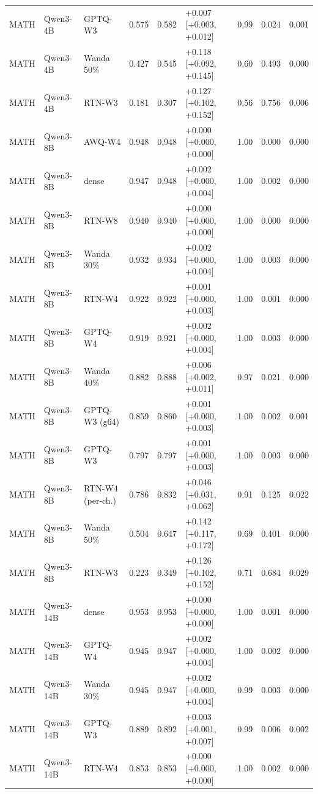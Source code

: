 \begin{tabular}{lllrrlrrr}
MATH & Qwen3-4B & GPTQ-W3 & 0.575 & 0.582 & +0.007 [+0.003, +0.012] & 0.99 & 0.024 & 0.001 \\
MATH & Qwen3-4B & Wanda 50\% & 0.427 & 0.545 & +0.118 [+0.092, +0.145] & 0.60 & 0.493 & 0.000 \\
MATH & Qwen3-4B & RTN-W3 & 0.181 & 0.307 & +0.127 [+0.102, +0.152] & 0.56 & 0.756 & 0.006 \\
MATH & Qwen3-8B & AWQ-W4 & 0.948 & 0.948 & +0.000 [+0.000, +0.000] & 1.00 & 0.000 & 0.000 \\
MATH & Qwen3-8B & dense & 0.947 & 0.948 & +0.002 [+0.000, +0.004] & 1.00 & 0.002 & 0.000 \\
MATH & Qwen3-8B & RTN-W8 & 0.940 & 0.940 & +0.000 [+0.000, +0.000] & 1.00 & 0.000 & 0.000 \\
MATH & Qwen3-8B & Wanda 30\% & 0.932 & 0.934 & +0.002 [+0.000, +0.004] & 1.00 & 0.003 & 0.000 \\
MATH & Qwen3-8B & RTN-W4 & 0.922 & 0.922 & +0.001 [+0.000, +0.003] & 1.00 & 0.001 & 0.000 \\
MATH & Qwen3-8B & GPTQ-W4 & 0.919 & 0.921 & +0.002 [+0.000, +0.004] & 1.00 & 0.003 & 0.000 \\
MATH & Qwen3-8B & Wanda 40\% & 0.882 & 0.888 & +0.006 [+0.002, +0.011] & 0.97 & 0.021 & 0.000 \\
MATH & Qwen3-8B & GPTQ-W3 (g64) & 0.859 & 0.860 & +0.001 [+0.000, +0.003] & 1.00 & 0.002 & 0.001 \\
MATH & Qwen3-8B & GPTQ-W3 & 0.797 & 0.797 & +0.001 [+0.000, +0.003] & 1.00 & 0.003 & 0.000 \\
MATH & Qwen3-8B & RTN-W4 (per-ch.) & 0.786 & 0.832 & +0.046 [+0.031, +0.062] & 0.91 & 0.125 & 0.022 \\
MATH & Qwen3-8B & Wanda 50\% & 0.504 & 0.647 & +0.142 [+0.117, +0.172] & 0.69 & 0.401 & 0.000 \\
MATH & Qwen3-8B & RTN-W3 & 0.223 & 0.349 & +0.126 [+0.102, +0.152] & 0.71 & 0.684 & 0.029 \\
MATH & Qwen3-14B & dense & 0.953 & 0.953 & +0.000 [+0.000, +0.000] & 1.00 & 0.001 & 0.000 \\
MATH & Qwen3-14B & GPTQ-W4 & 0.945 & 0.947 & +0.002 [+0.000, +0.004] & 1.00 & 0.002 & 0.000 \\
MATH & Qwen3-14B & Wanda 30\% & 0.945 & 0.947 & +0.002 [+0.000, +0.004] & 0.99 & 0.003 & 0.000 \\
MATH & Qwen3-14B & GPTQ-W3 & 0.889 & 0.892 & +0.003 [+0.001, +0.007] & 0.99 & 0.006 & 0.002 \\
MATH & Qwen3-14B & RTN-W4 & 0.853 & 0.853 & +0.000 [+0.000, +0.000] & 1.00 & 0.002 & 0.000 \\

\end{tabular}
